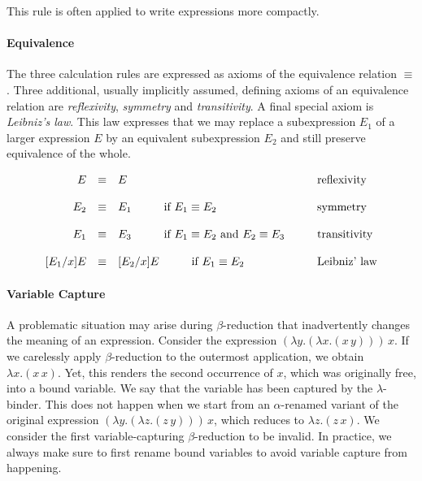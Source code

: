 This rule is often applied to write expressions more compactly.

\paragraph{Equivalence}
The three calculation rules are expressed as axioms of the equivalence relation
$\equiv$. Three additional, usually implicitly assumed, defining axioms of an equivalence relation
are 
\textit{reflexivity}, \textit{symmetry} and \textit{transitivity}. 
A final special axiom is \emph{Leibniz's law}. This law expresses that
we may replace a subexpression 
$E_1$ of a larger expression $E$ by an equivalent subexpression $E_2$ and still preserve
equivalence of the whole.
\begin{framed}
\begin{equation*}
\begin{array}{rcl@{\hspace{1cm}}l}
 E & \equiv  & E                    & \text{reflexivity} \\ \ \\[0cm] 
 E_2 & \equiv & E_1\hspace{1cm}\text{if }E_1 \equiv E_2 & \text{symmetry} \\ \ \\[0cm]
 E_1 & \equiv & E_3\hspace{1cm}\text{if }E_1 \equiv E_2\text{ and }E_2 \equiv E_3 & \text{transitivity} \\ \ \\[0cm]
 [{E_1}/x] E  & \equiv & [E_2/x]E  \hspace{1cm}\text{if }E_1 \equiv E_2     & \text{Leibniz' law}
\end{array}
\end{equation*}
\end{framed}

\paragraph{Variable Capture}
A problematic situation may arise during $\beta$-reduction that
inadvertently changes the meaning of an expression.
Consider the expression
$(\lambda y.(\lambda x.(x\,y)))\,x$. If we carelessly apply $\beta$-reduction
to the outermost application, we obtain $\lambda x.(x\,x)$. Yet, this renders
the second occurrence of $x$, which was originally free, into a bound variable.
We say that the variable has been captured by the $\lambda$-binder. This does
not happen when we start from an $\alpha$-renamed variant of the original
expression
$(\lambda y.(\lambda z.(z\,y)))\,x$, which reduces to
$\lambda z.(z\,x)$. 
We consider the first variable-capturing $\beta$-reduction to be invalid.
In practice, we always make sure to first rename bound variables to avoid
variable capture from happening.

